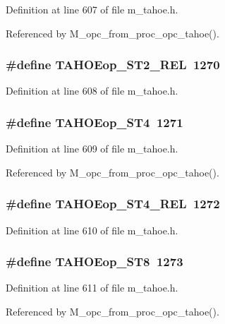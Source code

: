 Definition at line 607 of file m\_\-tahoe.h.

Referenced by M\_\-opc\_\-from\_\-proc\_\-opc\_\-tahoe().
\subsubsection{\setlength{\rightskip}{0pt plus 5cm}\#define TAHOEop\_\-ST2\_\-REL~1270}\label{m__tahoe_8h_4b68ff7608bcccaf5ff5676bb41c7d58}




Definition at line 608 of file m\_\-tahoe.h.
\subsubsection{\setlength{\rightskip}{0pt plus 5cm}\#define TAHOEop\_\-ST4~1271}\label{m__tahoe_8h_863efa8f63fd0bffb482b0374bf83412}




Definition at line 609 of file m\_\-tahoe.h.

Referenced by M\_\-opc\_\-from\_\-proc\_\-opc\_\-tahoe().
\subsubsection{\setlength{\rightskip}{0pt plus 5cm}\#define TAHOEop\_\-ST4\_\-REL~1272}\label{m__tahoe_8h_7d910e9f4d25089fac391bb05a044ee9}




Definition at line 610 of file m\_\-tahoe.h.
\subsubsection{\setlength{\rightskip}{0pt plus 5cm}\#define TAHOEop\_\-ST8~1273}\label{m__tahoe_8h_e1121ce521cb933909ad44b6c256373a}




Definition at line 611 of file m\_\-tahoe.h.

Referenced by M\_\-opc\_\-from\_\-proc\_\-opc\_\-tahoe().
